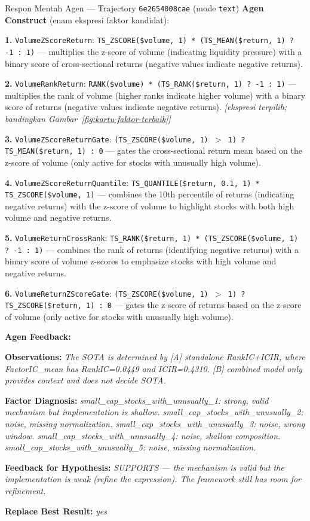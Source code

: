 \begin{kotakrespon}{Respon Mentah Agen --- Trajectory \texttt{6e2654008cae} (mode \texttt{text})}
\vspace{2mm}
\textbf{Agen Construct} (enam ekspresi faktor kandidat):

\noindent\textbf{1.} \texttt{VolumeZScoreReturn}: \texttt{TS\_ZSCORE(\$volume,
1) * (TS\_MEAN(\$return, 1) ? -1 : 1)} --- multiplies the z-score of
volume (indicating liquidity pressure) with a binary score of
cross-sectional returns (negative values indicate negative
returns).\par
\noindent\textbf{2.} \texttt{VolumeRankReturn}: \texttt{RANK(\$volume) *
(TS\_RANK(\$return, 1) ? -1 : 1)} --- multiplies the rank of volume
(higher ranks indicate higher volume) with a binary score of returns
(negative values indicate negative returns). \textit{[ekspresi terpilih;
bandingkan Gambar~\ref{fig:kartu-faktor-terbaik}]}\par
\noindent\textbf{3.} \texttt{VolumeZScoreReturnGate}:
\texttt{(TS\_ZSCORE(\$volume, 1) $>$ 1) ? TS\_MEAN(\$return, 1) : 0} ---
gates the cross-sectional return mean based on the z-score of volume
(only active for stocks with unusually high volume).\par
\noindent\textbf{4.} \texttt{VolumeZScoreReturnQuantile}:
\texttt{TS\_QUANTILE(\$return, 0.1, 1) * TS\_ZSCORE(\$volume, 1)} ---
combines the 10th percentile of returns (indicating negative returns)
with the z-score of volume to highlight stocks with both high volume and
negative returns.\par
\noindent\textbf{5.} \texttt{VolumeReturnCrossRank}: \texttt{TS\_RANK(\$return,
1) * (TS\_ZSCORE(\$volume, 1) ? -1 : 1)} --- combines the rank of
returns (identifying negative returns) with a binary score of volume
z-scores to emphasize stocks with high volume and negative returns.\par
\noindent\textbf{6.} \texttt{VolumeReturnZScoreGate}:
\texttt{(TS\_ZSCORE(\$volume, 1) $>$ 1) ? TS\_ZSCORE(\$return, 1) : 0} ---
gates the z-score of returns based on the z-score of volume (only active
for stocks with unusually high volume).

\textbf{Agen Feedback:}\par
\textbf{Observations:} \textit{The SOTA is determined by [A] standalone
RankIC+ICIR, where FactorIC\_mean has RankIC=0.0449 and ICIR=0.4310. [B]
combined model only provides context and does not decide SOTA.}

\textbf{Factor Diagnosis:} \textit{small\_cap\_stocks\_with\_unusually\_1:
strong, valid mechanism but implementation is shallow.
small\_cap\_stocks\_with\_unusually\_2: noise, missing normalization.
small\_cap\_stocks\_with\_unusually\_3: noise, wrong window.
small\_cap\_stocks\_with\_unusually\_4: noise, shallow composition.
small\_cap\_stocks\_with\_unusually\_5: noise, missing normalization.}

\textbf{Feedback for Hypothesis:} \textit{SUPPORTS --- the mechanism is
valid but the implementation is weak (refine the expression). The
framework still has room for refinement.}

\textbf{Replace Best Result:} \textit{yes}

\end{kotakrespon}
